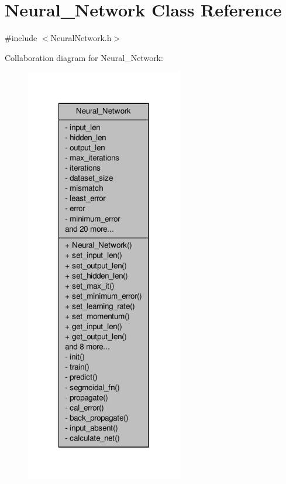 \hypertarget{a00003}{\section{Neural\-\_\-\-Network Class Reference}
\label{d1/d7c/a00003}
}


{\ttfamily \#include $<$Neural\-Network.\-h$>$}



Collaboration diagram for Neural\-\_\-\-Network\-:
\nopagebreak
\begin{figure}[H]
\begin{center}
\leavevmode
\includegraphics[width=194pt]{d3/dea/a00046}
\end{center}
\end{figure}
